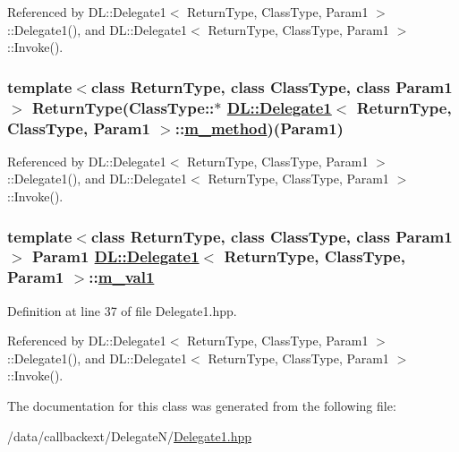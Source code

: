 Referenced by DL::Delegate1$<$ Return\-Type, Class\-Type, Param1 $>$::Delegate1(), and DL::Delegate1$<$ Return\-Type, Class\-Type, Param1 $>$::Invoke().\hypertarget{classDL_1_1Delegate1_r1}{
\subsubsection[m\_\-method]{\setlength{\rightskip}{0pt plus 5cm}template$<$class Return\-Type, class Class\-Type, class Param1$>$ Return\-Type(Class\-Type::$\ast$ \hyperlink{classDL_1_1Delegate1}{DL::Delegate1}$<$ Return\-Type, Class\-Type, Param1 $>$::\hyperlink{classDL_1_1Delegate1_r1}{m\_\-method})(Param1)}}
\label{classDL_1_1Delegate1_r1}




Referenced by DL::Delegate1$<$ Return\-Type, Class\-Type, Param1 $>$::Delegate1(), and DL::Delegate1$<$ Return\-Type, Class\-Type, Param1 $>$::Invoke().\hypertarget{classDL_1_1Delegate1_r2}{
\subsubsection[m\_\-val1]{\setlength{\rightskip}{0pt plus 5cm}template$<$class Return\-Type, class Class\-Type, class Param1$>$ Param1 \hyperlink{classDL_1_1Delegate1}{DL::Delegate1}$<$ Return\-Type, Class\-Type, Param1 $>$::\hyperlink{classDL_1_1Delegate1_r2}{m\_\-val1}}}
\label{classDL_1_1Delegate1_r2}




Definition at line 37 of file Delegate1.hpp.

Referenced by DL::Delegate1$<$ Return\-Type, Class\-Type, Param1 $>$::Delegate1(), and DL::Delegate1$<$ Return\-Type, Class\-Type, Param1 $>$::Invoke().

The documentation for this class was generated from the following file:\begin{CompactItemize}
\item 
/data/callbackext/Delegate\-N/\hyperlink{Delegate1_8hpp}{Delegate1.hpp}\end{CompactItemize}
